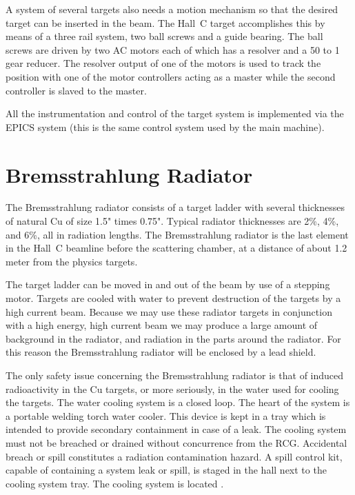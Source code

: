 A system of several targets also needs a motion mechanism so that the desired
target can be inserted in the beam. The Hall~C target accomplishes this by
means of a three rail system, two ball screws and a guide bearing.
The ball screws are driven by two AC motors each of which has a resolver and
a 50 to 1 gear reducer. The resolver output of one of the motors is used
to track the position with one of the motor controllers acting as a master
while the second controller is slaved to the master.

All the instrumentation and control of the target system is implemented
via the EPICS system (this is the same control system used by the main
machine).



\section{Bremsstrahlung Radiator}

The Bremsstrahlung radiator consists of a target ladder with
several thicknesses of natural Cu of size 1.5" times 0.75".
Typical radiator thicknesses are 2\%, 4\%, and 6\%, all in
radiation lengths. The Bremsstrahlung radiator is the last element
in the Hall~C beamline before the scattering chamber, at a distance
of about 1.2 meter from the physics targets.

The target ladder can be moved in and out of the beam by use of
a stepping motor. Targets are cooled with water to prevent destruction
of the targets by a high current beam.
Because we may use these radiator targets in conjunction with a high
energy, high current beam we may produce a large amount of background
in the radiator, and radiation in the parts around the radiator.
For this reason the Bremsstrahlung radiator will be enclosed by a lead
shield.

The only safety issue concerning the Bremsstrahlung radiator is that of
induced radioactivity in
the Cu targets, or more seriously, in the water used for cooling the targets.
 The water cooling system is a closed loop. The heart of the system is
a portable welding torch water cooler. This device is kept in a tray
which is intended to provide secondary containment in case of a leak.
 The cooling system must not be breached or drained without concurrence from the RCG.  
Accidental breach or spill constitutes a radiation contamination hazard.  A spill control kit, 
capable of containing a system leak or spill, is staged in the hall next to the cooling system 
tray.  The cooling system is located    .

